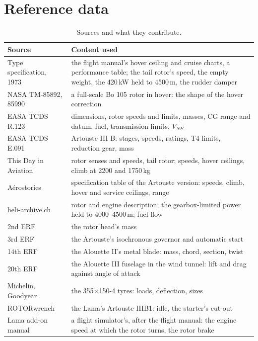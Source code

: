\documentclass[10pt,a4paper,twocolumn]{article}
\begin{document}
\section{Reference data}\label{sec:ref}
\begin{table}[t]
\centering\small
\caption{Sources and what they contribute.}\label{tab:sources}
\begin{tabularx}{\columnwidth}{@{}>{\raggedright\arraybackslash}p{2.3cm}X@{}}
\toprule
Source & Content used \\
\midrule
Type specification, 1973~\cite{spec} & the flight manual's hover ceiling and cruise charts, a performance table; the tail rotor's speed, the empty weight, the 420\,kW held to 4500\,m, the rudder damper \\
NASA TM-85892, 85990~\cite{bo92,bo90} & a full-scale Bo 105 rotor in hover: the shape of the hover correction \\
EASA TCDS R.123~\cite{tc} & dimensions, rotor speeds and limits, masses, CG range and datum, fuel, transmission limits, $V_{NE}$ \\
EASA TCDS E.091~\cite{te} & Artouste III B: stages, speeds, ratings, T4 limits, reduction gear, mass \\
This Day in Aviation~\cite{td} & rotor senses and speeds, tail rotor; speeds, hover ceilings, climb at 2200 and 1750\,kg \\
A\'erostories~\cite{as} & specification table of the Artouste version: speeds, climb, hover and service ceilings, range \\
heli-archive.ch \cite{ha} & rotor and engine description; the gearbox-limited power held to 4000--4500\,m; fuel flow \\
2nd ERF~\cite{e76} & the rotor head's mass \\
3rd ERF~\cite{e77} & the Artouste's isochronous governor and automatic start \\
14th ERF~\cite{e88} & the Alouette II's metal blade: mass, chord, section, twist \\
20th ERF~\cite{e94} & the Alouette III fuselage in the wind tunnel: lift and drag against angle of attack \\
Michelin, Goodyear~\cite{mi} & the 355$\times$150-4 tyres: loads, deflection, sizes \\
ROTORwrench \cite{rw} & the Lama's Artouste IIIB1: idle, the starter's cut-out \\
Lama add-on manual~\cite{lm} & a flight simulator's, after the flight manual: the engine speed at which the rotor turns, the rotor brake \\

\end{tabularx}
\end{table}
\end{document}
